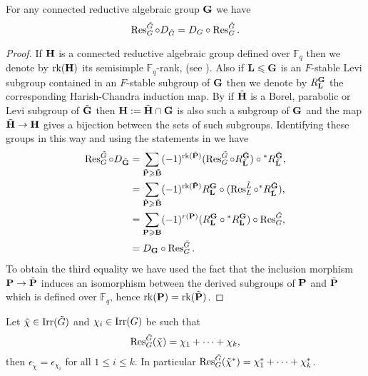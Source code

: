 \documentclass{jt-calcs}
\begin{document}
\begin{lem}\label{lem:duality-restriction}
For any connected reductive algebraic group $\mathbf{G}$ we have
\begin{equation*}
\operatorname{Res}_{G}^{\tilde{G}} \circ D_{\tilde{G}} = D_G \circ \operatorname{Res}_{G}^{\tilde{G}}.
\end{equation*}
\end{lem}

\begin{proof}
If $\mathbf{H}$ is a connected reductive algebraic group defined over $\mathbb{F}_q$ then we denote by $\operatorname{rk}(\mathbf{H})$ its semisimple $\mathbb{F}_q$-rank, (see \cite[Definition 8.6]{digne-michel:1991:representations-of-finite-groups-of-lie-type}). Also if $\mathbf{L} \leqslant \mathbf{G}$ is an $F$-stable Levi subgroup contained in an $F$-stable subgroup of $\mathbf{G}$ then we denote by $R_{\mathbf{L}}^{\mathbf{G}}$ the corresponding Harish-Chandra induction map. By \cite[Proposition 2.2]{digne-michel:1991:representations-of-finite-groups-of-lie-type} if $\tilde{\mathbf{H}}$ is a Borel, parabolic or Levi subgroup of $\tilde{\mathbf{G}}$ then $\mathbf{H}:=\tilde{\mathbf{H}}\cap\mathbf{G}$ is also such a subgroup of $\mathbf{G}$ and the map $\tilde{\mathbf{H}} \to \mathbf{H}$ gives a bijection between the sets of such subgroups. Identifying these groups in this way and using the statements in \cite[Proposition 10.10]{bonnafe:2006:sln} we have
\begin{align*}
\operatorname{Res}_G^{\tilde{G}} \circ D_{\tilde{\mathbf{G}}} &= \sum_{\tilde{\mathbf{P}} \geqslant \tilde{\mathbf{B}}} (-1)^{\operatorname{rk}(\tilde{\mathbf{P}})} (\operatorname{Res}_G^{\tilde{G}} \circ R_{\tilde{\mathbf{L}}}^{\tilde{\mathbf{G}}} )\circ {}^*R_{\tilde{\mathbf{L}}}^{\tilde{\mathbf{G}}},\\
&= \sum_{\tilde{\mathbf{P}} \geqslant \tilde{\mathbf{B}}} (-1)^{\operatorname{rk}(\tilde{\mathbf{P}})} R_{\mathbf{L}}^{\mathbf{G}} \circ (\operatorname{Res}_L^{\tilde{L}}\circ {}^*R_{\tilde{\mathbf{L}}}^{\tilde{\mathbf{G}}}),\\
&= \sum_{\mathbf{P} \geqslant \mathbf{B}} (-1)^{r(\mathbf{P})} (R_{\mathbf{L}}^{\mathbf{G}} \circ {}^*R_{\mathbf{L}}^{\mathbf{G}}) \circ \operatorname{Res}_G^{\tilde{G}},\\
&= D_{\mathbf{G}} \circ \operatorname{Res}_G^{\tilde{G}}.
\end{align*}
To obtain the third equality we have used the fact that the inclusion morphism $\mathbf{P} \to \tilde{\mathbf{P}}$ induces an isomorphism between the derived subgroups of $\mathbf{P}$ and $\tilde{\mathbf{P}}$ which is defined over $\mathbb{F}_q$, hence $\operatorname{rk}(\mathbf{P}) = \operatorname{rk}(\tilde{\mathbf{P}})$.
\end{proof}

\begin{cor}\label{cor:dual-restrict}
Let $\tilde{\chi} \in \operatorname{Irr}(\tilde{G})$ and $\chi_i \in \operatorname{Irr}(G)$ be such that
\begin{equation*}
\operatorname{Res}^{\tilde{G}}_{G}(\tilde{\chi}) = \chi_1+\cdots+\chi_k,
\end{equation*}
then $\epsilon_{\tilde{\chi}} = \epsilon_{\chi_i}$ for all $1 \leqslant i \leqslant k$. In particular $\operatorname{Res}^{\tilde{G}}_G(\tilde{\chi}^*) = \chi_1^* + \cdots + \chi_k^*$.
\end{cor}
\end{document}
